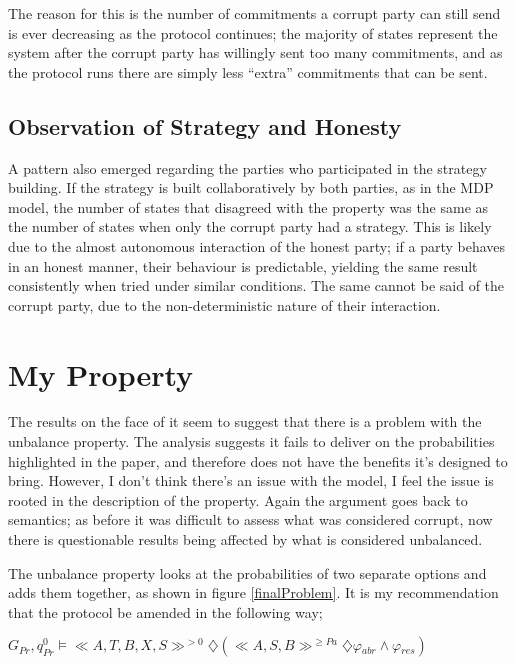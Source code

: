 \documentclass{l4proj}
\begin{document}
The reason for this is the number of commitments a corrupt party can still send is ever decreasing as the protocol continues; the majority of states represent the system after the corrupt party has willingly sent too many commitments, and as the protocol runs there are simply less ``extra'' commitments that can be sent.

\subsection{Observation of Strategy and Honesty}

A pattern also emerged regarding the parties who participated in the strategy building. If the strategy is built collaboratively by both parties, as in the MDP model, the number of states that disagreed with the property was the same as the number of states when only the corrupt party had a strategy. This is likely due to the almost autonomous interaction of the honest party; if a party behaves in an honest manner, their behaviour is predictable, yielding the same result consistently when tried under similar conditions. The same cannot be said of the corrupt party, due to the non-deterministic nature of their interaction.

\section{My Property}

The results on the face of it seem to suggest that there is a problem with the unbalance property. The analysis suggests it fails to deliver on the probabilities highlighted in the paper, and therefore does not have the benefits it's designed to bring. However, I don't think there's an issue with the model, I feel the issue is rooted in the description of the property. Again the argument goes back to semantics; as before it was difficult to assess what was considered corrupt, now there is questionable results being affected by what is considered unbalanced. 

The unbalance property looks at the probabilities of two separate options and adds them together, as shown in figure \ref{finalProblem}. It is my recommendation that the protocol be amended in the following way;\\

\centerline{$ G{_{Pr}},q_{Pr}^{0}\models  \ll A, T, B, X, S \gg ^{>0} \diamondsuit (\ll A, S, B \gg^{\ge Pa} \diamondsuit \varphi{_{abr}} \wedge \varphi{_{res}}) $}
\end{document}
